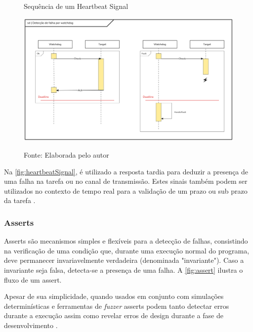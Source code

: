 \begin{figure}[H]
    \centering
	\captionsetup{justification=centering}
    \caption{Sequência de um Heartbeat Signal}
    \includegraphics[width=1.0\textwidth]{assets/heartbeat_signal.png}\\
	\captionsetup{justification=raggedright}
    \caption*{Fonte: Elaborada pelo autor}
    \label{fig:heartbeatSignal}
\end{figure}

Na \autoref{fig:heartbeatSignal}, é utilizado a resposta tardia para deduzir a presença de uma falha na tarefa ou no canal de transmissão. Estes sinais também podem ser utilizados no contexto de tempo real para a validação de um prazo ou sub prazo da tarefa \cite{FaultTolerantSystems}.

\subsubsection{Asserts}

Asserts são mecanismos simples e flexíveis para a detecção de falhas, consistindo na verificação de uma condição que, durante uma execução normal do programa, deve permanecer invariavelmente verdadeira (denominada "invariante"). Caso a invariante seja falsa, detecta-se a presença de uma falha. A \autoref{fig:assert} ilustra o fluxo de um assert.


Apesar de sua simplicidade, quando usados em conjunto com simulações determinísticas e ferramentas de \textit{fuzzer} asserts podem tanto detectar erros durante a execução assim como revelar erros de design durante a fase de desenvolvimento \cite{TigerBeetleSafety} \cite{PowerOf10Rules}.


